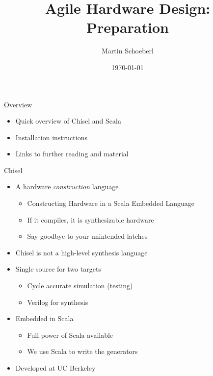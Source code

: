 

\newif\ifbook


\title{Agile Hardware Design: Preparation}
\author{Martin Schoeberl}
\date{\today}



\begin{frame}
\titlepage
\end{frame}

\begin{frame}[fragile]{Overview}
\begin{itemize}
\item Quick overview of Chisel and Scala
\item Installation instructions
\item Links to further reading and material
\end{itemize}
\end{frame}

\begin{frame}[fragile]{Chisel}
\begin{itemize}
\item A hardware \emph{construction} language
\begin{itemize}
\item Constructing Hardware in a Scala Embedded Language
\item If it compiles, it is synthesizable hardware 
\item Say goodbye to your unintended latches
\end{itemize}
\item Chisel is not a high-level synthesis language
\item Single source for two targets
\begin{itemize}
\item Cycle accurate simulation (testing)
\item Verilog for synthesis
\end{itemize}
\item Embedded in Scala
\begin{itemize}
\item Full power of Scala available
\item We use Scala to write the generators
\end{itemize}
\item Developed at UC Berkeley
\end{itemize}
\end{frame}

